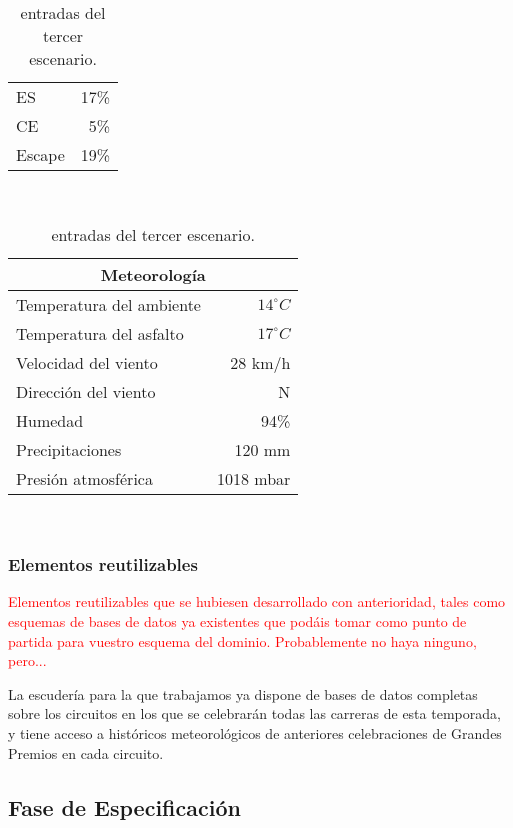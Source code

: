 \documentclass[12pt,a4paper,twoside,spanish]{article}      %
\begin{document}
\begin{table}[H]
\begin{tabular}{lr}
        ES & 17\% \\
        CE & 5\% \\
        Escape & 19\% \\ \bottomrule
    \end{tabular} \\ \vspace{1em}
    \begin{tabular}{lr}
        \toprule
        \multicolumn{2}{c}{\textbf{Meteorología}} \\ \midrule
        Temperatura del ambiente & $14^\circ C$ \\
        Temperatura del asfalto & $17^\circ C$ \\
        Velocidad del viento & 28 km/h \\
        Dirección del viento & N \\
        Humedad & 94\% \\
        Precipitaciones & 120 mm \\
        Presión atmosférica & 1018 mbar \\ \bottomrule
    \end{tabular} \\ \vspace{1em}
    \caption{entradas del tercer escenario.}
    \label{tab:in_esc_2}
\end{table}

\subsubsection{Elementos reutilizables}

\textcolor {red} {Elementos reutilizables que se hubiesen desarrollado con anterioridad, tales como esquemas de bases de datos ya existentes que podáis tomar como punto de partida para vuestro esquema del dominio. Probablemente no haya ninguno, pero...}

La escudería para la que trabajamos ya dispone de bases de datos completas sobre los circuitos en los que se celebrarán todas las carreras de esta temporada, y tiene acceso a históricos meteorológicos de anteriores celebraciones de Grandes Premios en cada circuito.


\subsection{Fase de Especificación}
\end{document}
